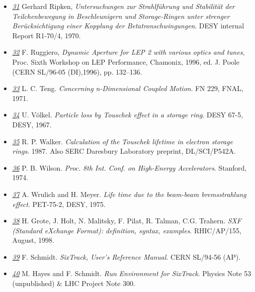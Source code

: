 \begin{itemize}
	\item \href{ripken}{\textit{31}} Gerhard Ripken, \textit{Untersuchungen zur Strahlf\"uhrung und Stabilit\"at der Teilchenbewegung in Beschleunigern und Storage-Ringen unter strenger Ber\"ucksichtigung einer Kopplung der Betatronschwingungen}. DESY internal Report R1-70/4, 1970. 


	\item \href{chamonix96}{\textit{32}} F. Ruggiero, \textit{Dynamic Aperture for LEP 2 with various optics and tunes}, Proc. Sixth Workshop on LEP Performance, Chamonix, 1996, ed. J. Poole (CERN SL/96-05 (DI),1996), pp. 132--136. 


	\item \href{teng}{\textit{33}} L. C. Teng. \textit{Concerning n-Dimensional Coupled Motion}. FN 229, FNAL, 1971. 


	\item \href{voelkel}{\textit{34}} U. V\"olkel. \textit{Particle loss by Touschek effect in a storage ring}. DESY 67-5, DESY, 1967. 


	\item \href{walker}{\textit{35}} R. P. Walker. \textit{Calculation of the Touschek lifetime in electron storage rings}. 1987. Also SERC Daresbury Laboratory preprint, DL/SCI/P542A. 


	\item \href{wilson}{\textit{36}} P. B. Wilson. \textit{Proc. 8th Int. Conf. on High-Energy Accelerators}. Stanford, 1974. 


	\item \href{wrulich}{\textit{37}} A. Wrulich and H. Meyer. \textit{Life time due to the beam-beam bremsstrahlung effect}. PET-75-2, DESY, 1975. 


	\item \href{SXF}{\textit{38}}  H. Grote, J. Holt, N. Malitsky, F. Pilat, R. Talman, C.G. Trahern. \textit{SXF (Standard eXchange Format): definition, syntax, examples}. RHIC/AP/155, August, 1998.  




	\item \href{SixTrack}{\textit{39}} F. Schmidt. \textit{SixTrack, User's Reference Manual}. CERN SL/94-56 (AP). 




	\item \href{SixTrack_Run_Environment}{\textit{40}} M. Hayes and F. Schmidt. \textit{Run Environment for SixTrack}. Physics Note 53 (unpublished) \& LHC Project Note 300. 





\end{itemize}
